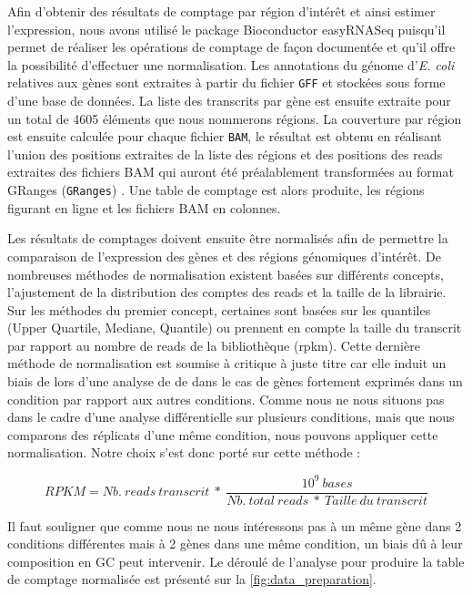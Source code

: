 \documentclass[12pt,a4paper]{report}
\begin{document}
\begin{onehalfspace}
Afin d'obtenir des résultats de comptage par région d'intérêt et ainsi estimer l'expression, nous avons utilisé le package Bioconductor easyRNASeq \citep{Delhomme2012} puisqu'il permet de réaliser les opérations de comptage de façon documentée et qu'il offre la possibilité d'effectuer une normalisation. Les annotations du génome d'\textit{E. coli} relatives aux gènes sont extraites à partir du fichier \texttt{GFF} et stockées sous forme d'une base de données.
La liste des transcrits par gène est ensuite extraite pour un total de 4605 éléments que nous nommerons régions. La couverture par région est ensuite calculée pour chaque fichier \texttt{BAM}, le résultat est obtenu en réalisant l'union des positions extraites de la liste des régions et des positions des reads extraites des fichiers BAM qui auront été préalablement transformées au format \gls{GRanges} (\texttt{GRanges})  \citep{Lawrence2013}. Une table de comptage est alors produite, les régions figurant en ligne et les fichiers BAM en colonnes.

Les résultats de comptages doivent ensuite être normalisés afin de permettre la comparaison de l'expression des gènes et des régions génomiques d'intérêt. De nombreuses méthodes de normalisation existent basées sur différents concepts, l'ajustement de la distribution des comptes des reads et la taille de la librairie. Sur les méthodes du premier concept, certaines sont basées sur les quantiles (Upper Quartile, Mediane, Quantile) ou prennent en compte la taille du transcrit par rapport au nombre de reads de la bibliothèque (\gls{rpkm}). Cette dernière méthode de normalisation est soumise à critique à juste titre \citep{Dillies2013} car elle induit un biais de lors d'une analyse de \gls{de} dans le cas de gènes fortement exprimés dans un condition par rapport aux autres conditions. Comme nous ne nous situons pas dans le cadre d'une analyse différentielle sur plusieurs conditions, mais que nous comparons des réplicats d'une même condition, nous pouvons appliquer cette normalisation. Notre choix s'est donc porté sur cette méthode \citep{Mortazavi2008} :

\[RPKM = Nb.~reads~transcrit~*~\frac{10^9~bases}{Nb.~total~reads~*~Taille~du~transcrit}\]

Il faut souligner que comme nous ne nous intéressons pas à un même gène dans 2 conditions différentes mais à 2 gènes dans une même condition, un biais dû à leur composition en GC peut intervenir. Le déroulé de l'analyse pour produire la table de comptage normalisée est présenté sur la \autoref{fig:data_preparation}.


\end{onehalfspace}
\end{document}
